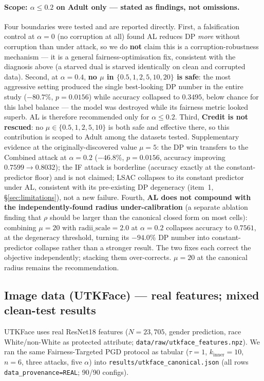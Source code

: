 \paragraph{Scope: $\alpha\le0.2$ on Adult only --- stated as findings, not
omissions.} Four boundaries were tested and are reported directly. First, a
falsification control at $\alpha{=}0$ (no corruption at all) found AL reduces
DP \emph{more} without corruption than under attack, so we do \textbf{not}
claim this is a corruption-robustness mechanism --- it is a general
fairness-optimisation fix, consistent with the diagnosis above (a starved dual
is starved identically on clean and corrupted data). Second, at
$\alpha{=}0.4$, \textbf{no $\mu$ in $\{0.5,1,2,5,10,20\}$ is safe}: the most
aggressive setting produced the single best-looking DP number in the entire
study ($-80.7\%$, $p{=}0.0156$) while accuracy collapsed to $0.3495$, below
chance for this label balance --- the model was destroyed while its fairness
metric looked superb. AL is therefore recommended only for $\alpha\le0.2$.
Third, \textbf{Credit is not rescued}: no $\mu\in\{0.5,1,2,5,10\}$ is both
safe and effective there, so this contribution is scoped to Adult among the
datasets tested. Supplementary evidence at the originally-discovered value
$\mu{=}5$: the DP win transfers to the Combined attack at $\alpha{=}0.2$
($-46.8\%$, $p{=}0.0156$, accuracy improving $0.7599\to0.8032$); the IF attack
is borderline (accuracy exactly at the constant-predictor floor) and is not
claimed; LSAC collapses to its constant predictor under AL, consistent with
its pre-existing DP degeneracy (item~1, \S\ref{sec:limitations}), not a new
failure. Fourth, \textbf{AL does not compound with the independently-found
radius under-calibration} (a separate ablation finding that $\rho$ should be
larger than the canonical closed form on most cells): combining $\mu{=}20$
with $\mathrm{radii\_scale}{=}2.0$ at $\alpha{=}0.2$ collapses accuracy to
$0.7561$, at the degeneracy threshold, turning its $-94.0\%$ DP number into
constant-predictor collapse rather than a stronger result. The two fixes each
correct the objective independently; stacking them over-corrects. $\mu{=}20$
at the canonical radius remains the recommendation.

\subsection{Image data (UTKFace) --- real features; mixed clean-test results}
\label{sec:results-utkface}

UTKFace uses real ResNet18 features ($N{=}23{,}705$, gender prediction,
race White/non-White as protected attribute;
\texttt{data/raw/utkface\_features.npz}).  We ran the same Fairness-Targeted
PGD protocol as tabular ($\tau{=}1$, $k_{\mathrm{inner}}{=}10$, $n{=}6$,
three attacks, five $\alpha$) into
\texttt{results/utkface\_canonical.json} (all rows
\texttt{data\_provenance{=}REAL}; 90/90 configs).

